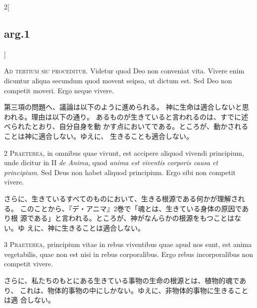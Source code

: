 \documentclass[paper=a4paper,fontsize=10pt,jafontsize=9pt,titlepage]{jlreq}
\begin{document}
\begin{paracol}{2}[\subsection{arg.1}]


{\huge A}{\scshape d tertium sic proceditur}. Videtur quod Deo non
conveniat vita. Vivere enim dicuntur aliqua secundum quod movent seipsa,
ut dictum est. Sed Deo non competit moveri. Ergo neque vivere.

\switchcolumn

第三項の問題へ、議論は以下のように進められる。
神に生命は適合しないと思われる。理由は以下の通り。
あるものが生きていると言われるのは、すでに述べられたとおり、自分自身を動
 かす点においてである。ところが、動かされることは神に適合しない。ゆえに、
 生きることも適合しない。



{\scshape 2 Praeterea}, in omnibus quae vivunt, est accipere aliquod
vivendi principium, unde dicitur in II {\itshape de Anima}, quod
{\itshape anima est viventis corporis causa et principium}. Sed Deus non
habet aliquod principium. Ergo sibi non competit vivere.

\switchcolumn

さらに、生きているすべてのものにおいて、生きる根源である何かが理解される。
 このことから、『デ・アニマ』2巻で「魂とは、生きている身体の原因であり根
 源である」と言われる。ところが、神がなんらかの根源をもつことはない。ゆ
 えに、神に生きることは適合しない。



{\scshape 3 Praeterea}, principium vitae in rebus viventibus quae apud
nos sunt, est anima vegetabilis, quae non est nisi in rebus
corporalibus. Ergo rebus incorporalibus non competit vivere.

\switchcolumn

さらに、私たちのもとにある生きている事物の生命の根源とは、植物的魂であり、
 これは、物体的事物の中にしかない。ゆえに、非物体的事物に生きることは適
 合しない。

\switchcolumn*[\subsection{s.c.}]



\end{paracol}
\end{document}
